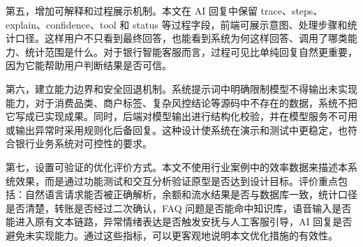 \documentclass[bachelor, print]{xduthesis}
\begin{document}
第五，增加可解释和过程展示机制。本文在 AI 回复中保留 trace、steps、explain、confidence、tool 和 status 等过程字段，前端可展示意图、处理步骤和统计口径。这样用户不只看到最终回答，也能看到系统为何这样回答、调用了哪类能力、统计范围是什么。对于银行智能客服而言，过程可见比单纯回复自然更重要，因为它能帮助用户判断结果是否可信。

第六，建立能力边界和安全回退机制。系统提示词中明确限制模型不得输出未实现能力，对于消费品类、商户标签、复杂风控结论等源码中不存在的数据，系统不把它写成已实现成果。同时，后端对模型输出进行结构化校验，并在模型服务不可用或输出异常时采用规则化后备回复。这种设计使系统在演示和测试中更稳定，也符合银行业务系统对可控性的要求。

第七，设置可验证的优化评价方式。本文不使用行业案例中的效率数据来描述本系统效果，而是通过功能测试和交互分析验证原型是否达到设计目标。评价重点包括：自然语言请求能否被正确解析，余额和流水结果是否与数据库一致，统计口径是否清楚，转账是否经过二次确认，FAQ 问题是否能命中知识库，语音输入是否能进入原有文本链路，异常情绪表达是否触发安抚与人工客服引导，AI 回复是否避免未实现能力。通过这些指标，可以更客观地说明本文优化措施的有效性。
\end{document}
